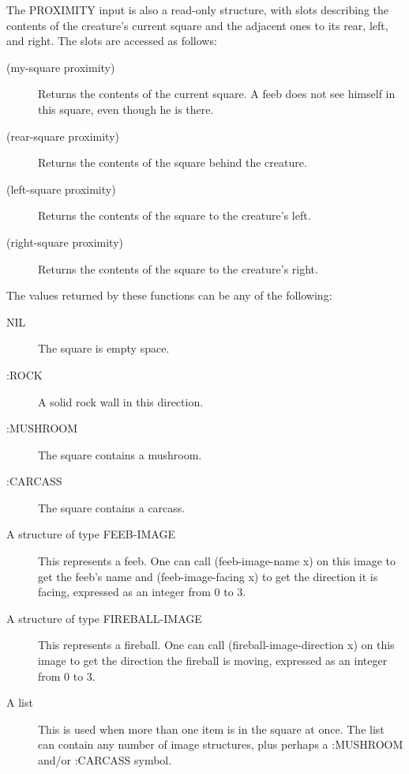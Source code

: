 \documentclass[12pt]{article}
\begin{document}
The PROXIMITY input is also a read-only structure, with slots describing
the contents of the creature's current square and the adjacent ones to
its rear, left, and right.  The slots are accessed as follows:

\begin{description}

\item[(my-square proximity)] Returns the contents of the current
square.  A feeb does not see himself in this square, even though he is
there.

\item[(rear-square proximity)] Returns the contents of the square
behind the creature.

\item[(left-square proximity)] Returns the contents of the square to
the creature's left.

\item[(right-square proximity)] Returns the contents of the square to
the creature's right.

\end{description}

The values returned by these functions can be any of the following:

\begin{description}

\item[NIL] The square is empty space.

\item[:ROCK] A solid rock wall in this direction.

\item[:MUSHROOM] The square contains a mushroom.

\item[:CARCASS] The square contains a carcass.

\item[A structure of type FEEB-IMAGE] This represents a feeb.  One can
call (feeb-image-name x) on this image to get the feeb's name and
(feeb-image-facing x) to get the direction it is facing, expressed as
an integer from 0 to 3.

\item[A structure of type FIREBALL-IMAGE] This represents a fireball.
One can call (fireball-image-direction x) on this image to get the
direction the fireball is moving, expressed as an integer from 0 to 3.

\item[A list] This is used when more than one item is in the square at
once.  The list can contain any number of image structures, plus
perhaps a :MUSHROOM and/or :CARCASS symbol.

\end{description}
\end{document}
